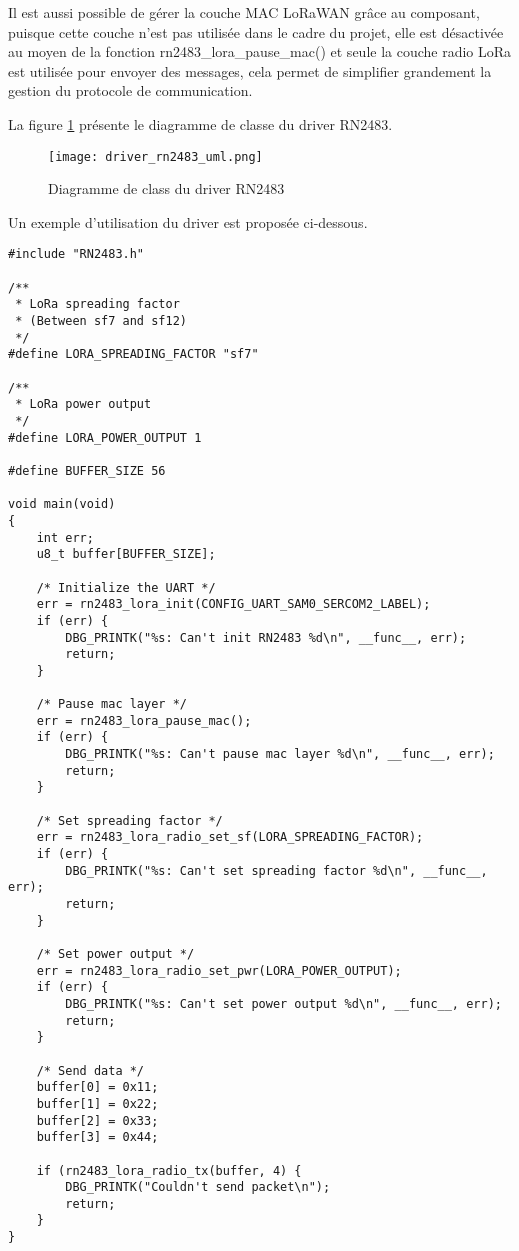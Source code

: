 Il est aussi possible de gérer la couche MAC LoRaWAN grâce au composant, puisque cette couche n'est pas utilisée dans le cadre du projet, elle est désactivée au moyen de la fonction rn2483\_lora\_pause\_mac() et seule la couche radio LoRa est utilisée pour envoyer des messages, cela permet de simplifier grandement la gestion du protocole de communication.

La figure \ref{fig:driver_rn2483_uml} présente le diagramme de classe du driver RN2483.

\begin{figure}[htb]
\centering 
\texttt{[image: driver\_rn2483\_uml.png]} 
\caption{Diagramme de class du driver RN2483}
\label{fig:driver_rn2483_uml}
\end{figure}

Un exemple d'utilisation du driver est proposée ci-dessous.

\begin{lstlisting}[style=CStyle]
#include "RN2483.h"

/**
 * LoRa spreading factor
 * (Between sf7 and sf12)
 */
#define LORA_SPREADING_FACTOR "sf7"

/**
 * LoRa power output
 */
#define LORA_POWER_OUTPUT 1

#define BUFFER_SIZE 56

void main(void)
{
	int err;
	u8_t buffer[BUFFER_SIZE];

	/* Initialize the UART */
	err = rn2483_lora_init(CONFIG_UART_SAM0_SERCOM2_LABEL);
	if (err) {
		DBG_PRINTK("%s: Can't init RN2483 %d\n", __func__, err);
		return;
	}

	/* Pause mac layer */
	err = rn2483_lora_pause_mac();
	if (err) {
		DBG_PRINTK("%s: Can't pause mac layer %d\n", __func__, err);
		return;
	}

	/* Set spreading factor */
	err = rn2483_lora_radio_set_sf(LORA_SPREADING_FACTOR);
	if (err) {
		DBG_PRINTK("%s: Can't set spreading factor %d\n", __func__, err);
		return;
	}

	/* Set power output */
	err = rn2483_lora_radio_set_pwr(LORA_POWER_OUTPUT);
	if (err) {
		DBG_PRINTK("%s: Can't set power output %d\n", __func__, err);
		return;
	}
	
	/* Send data */
	buffer[0] = 0x11;
	buffer[1] = 0x22;
	buffer[2] = 0x33;
	buffer[3] = 0x44;
	
	if (rn2483_lora_radio_tx(buffer, 4) {
		DBG_PRINTK("Couldn't send packet\n");
		return;
	}	
}
\end{lstlisting}

